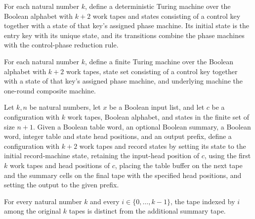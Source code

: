 \begin{definition}
\label{Turing.StepBlock.roundTM}
\leanok
{}
For each natural number $k$, define a deterministic Turing machine over the Boolean
alphabet with $k+2$ work tapes and states consisting of a control key together with a
state of that key’s assigned phase machine. Its initial state is the entry key with its
unique state, and its transitions combine the phase machines with the control-phase
reduction rule.
\end{definition}

\begin{definition}
\label{Turing.StepBlock.roundFinTM}
\leanok
{}
For each natural number $k$, define a finite Turing machine over the Boolean alphabet
with $k+2$ work tapes, state set consisting of a control key together with a state of
that key’s assigned phase machine, and underlying machine the one-round composite
machine.
\end{definition}

\begin{definition}
\label{Turing.StepBlock.roundData}
\leanok
{}
Let $k,n$ be natural numbers, let $x$ be a Boolean input list, and let $c$ be a
configuration with $k$ work tapes, Boolean alphabet, and states in the finite set of
size $n+1$. Given a Boolean table word, an optional Boolean summary, a Boolean word,
integer table and state head positions, and an output prefix, define a configuration
with $k+2$ work tapes and record states by setting its state to the initial
record-machine state, retaining the input-head position of $c$, using the first $k$ work
tapes and head positions of $c$, placing the table buffer on the next tape and the
summary cells on the final tape with the specified head positions, and setting the
output to the given prefix.
\end{definition}

\begin{lemma}
\label{Turing.StepBlock.mirror_ne_summary}
\leanok
{}
For every natural number $k$ and every $i\in\{0,\ldots,k-1\}$, the tape indexed by $i$
among the original $k$ tapes is distinct from the additional summary tape.
\end{lemma}


